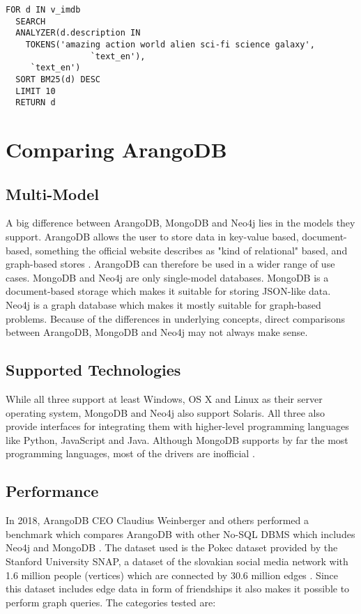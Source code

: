 \begin{lstlisting}[language=ArangoQL,caption={Searching a database of movie descriptions}]
FOR d IN v_imdb 
  SEARCH 
  ANALYZER(d.description IN 
    TOKENS('amazing action world alien sci-fi science galaxy', 
                 `text_en'),
     `text_en')
  SORT BM25(d) DESC 
  LIMIT 10 
  RETURN d
\end{lstlisting}

\section{Comparing ArangoDB}

\subsection{Multi-Model}
A big difference between ArangoDB, MongoDB and Neo4j lies in the models they support. ArangoDB allows the user to store data in key-value based, document-based, something the official website describes as "kind of relational" based, and graph-based stores \parencite{DBBenchmark}. ArangoDB can therefore be used in a wider range of use cases. MongoDB and Neo4j are only single-model databases. MongoDB is a document-based storage which makes it suitable for storing JSON-like data. Neo4j is a graph database which makes it mostly suitable for graph-based problems. Because of the differences in underlying concepts, direct comparisons between ArangoDB, MongoDB and Neo4j may not always make sense.

\subsection{Supported Technologies}

While all three support at least Windows, OS X and Linux as their server operating system, MongoDB and Neo4j also support Solaris. All three also provide interfaces for integrating them with higher-level programming languages like Python, JavaScript and Java. Although MongoDB supports by far the most programming languages, most of the drivers are inofficial \parencite{DBEnginesComparisons}.

\subsection{Performance}

In 2018, ArangoDB CEO Claudius Weinberger and others performed a benchmark which compares ArangoDB with other No-SQL DBMS which includes Neo4j and MongoDB \parencite{DBBenchmark}. The dataset used is the Pokec dataset provided by the Stanford University SNAP, a dataset of the slovakian social media network with 1.6 million people (vertices) which are connected by 30.6 million edges \parencite{Pokec}. Since this dataset includes edge data in form of friendships it also makes it possible to perform graph queries. The categories tested are:


